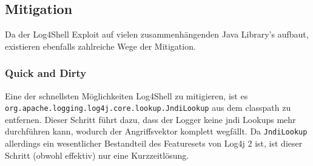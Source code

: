 
\subsection{Mitigation}\label{subsec:mitigation}
Da der Log4Shell Exploit auf vielen zusammenhängenden Java Library's aufbaut, existieren ebenfalls zahlreiche Wege der Mitigation.

\subsubsection{Quick and Dirty}
Eine der schnellsten Möglichkeiten Log4Shell zu mitigieren, ist es \verb|org.apache.logging.log4j.core.lookup.JndiLookup| aus dem classpath zu entfernen.
Dieser Schritt führt dazu, dass der Logger keine \gls{jndi} Lookups mehr durchführen kann, wodurch der Angriffsvektor komplett wegfällt.
Da \verb|JndiLookup| allerdings ein wesentlicher Bestandteil des Featuresets von Log4j 2 ist, ist dieser Schritt (obwohl effektiv) nur eine Kurzzeitlösung.

